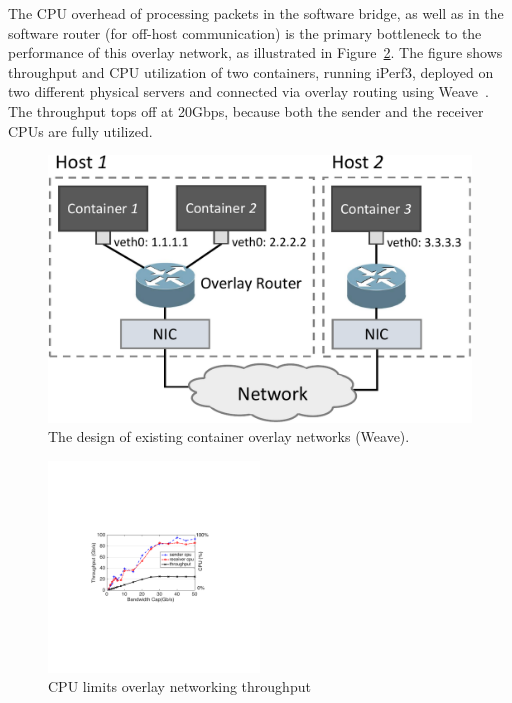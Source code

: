 The CPU overhead of processing packets in the software bridge, as well as in the
software router (for off-host communication) is the primary bottleneck to the
performance of this overlay network, as illustrated in
Figure~\ref{fig:mot_bw_cpu}. The figure shows throughput and CPU utilization of
two containers, running iPerf3, deployed on two different physical servers and
connected via overlay routing using Weave~\cite{weave}. The throughput tops off
at 20Gbps, because both the sender and the receiver CPUs are fully utilized.

\begin{figure} [t]
	\centering   
	\includegraphics[width=0.8\linewidth]{figures/overlay-2.pdf}   
	\caption{\label{fig:overlay} The design of existing container overlay networks (Weave).}   
\end{figure}   

\begin{figure}[t]
\centering 
\includegraphics[width=0.5\textwidth]{figures/motivation/mot_bw_cpu.pdf}      
\caption{\label{fig:mot_bw_cpu}CPU limits overlay networking throughput}
\end{figure}
